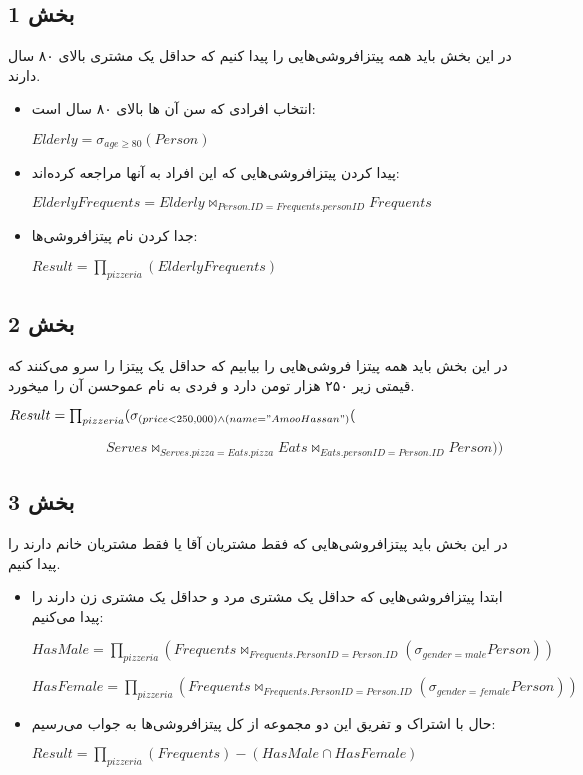 \subsection*{بخش 1}
در این بخش باید همه پیتزافروشی‌هایی را پیدا کنیم که حداقل یک مشتری بالای ۸۰ سال دارند.
\begin{itemize}	
	\item انتخاب افرادی که سن آن ها بالای ۸۰ سال است:
	
	\setLTR
	$Elderly = \sigma_{age \geq 80} (Person)$
	\setRTL
	\item پیدا کردن پیتزافروشی‌هایی که این افراد به آنها مراجعه کرده‌اند:
	
	\setLTR
	$ElderlyFrequents = Elderly \bowtie_{Person.ID=Frequents.personID} Frequents$
	\setRTL
	
	\item جدا کردن نام پیتزافروشی‌ها:
	
	\setLTR
	$Result = \prod_{pizzeria} (ElderlyFrequents)$
	\setRTL
\end{itemize}




\subsection*{بخش 2}
در این بخش باید همه پیتزا فروشی‌هایی را بیابیم که حداقل یک پیتزا را سرو می‌کنند که قیمتی زیر ۲۵۰ هزار
تومن دارد و فردی به نام عموحسن آن را میخورد.

	\setLTR
	$Result = \prod_{pizzeria}(\sigma_{(price<250,000)\land(name="Amoo Hassan")}($
	
	$\qquad \qquad \qquad \quad  Serves\bowtie_{Serves.pizza=Eats.pizza}Eats \bowtie_{Eats.personID=Person.ID}Person))$

	\setRTL


\subsection*{بخش 3}
در این بخش باید پیتزافروشی‌هایی که فقط مشتریان آقا یا فقط مشتریان خانم دارند را پیدا کنیم.
\begin{itemize}	
	\item 
	ابتدا پیتزافروشی‌هایی که حداقل یک مشتری مرد و حداقل یک مشتری زن دارند را پیدا می‌کنیم:
	
	\setLTR
	$HasMale = \prod_{pizzeria}(Frequents \bowtie_{Frequents.PersonID=Person.ID}(\sigma_{gender=male}Person))$
	
	$HasFemale = \prod_{pizzeria}(Frequents \bowtie_{Frequents.PersonID=Person.ID}(\sigma_{gender=female}Person))$
	\setRTL
	
	\item 
	حال با اشتراک و تفریق این دو مجموعه از کل پیتزافروشی‌ها به جواب می‌رسیم:
	\setLTR
	
	$Result = \prod_{pizzeria}(Frequents) - (HasMale \cap HasFemale)$
	\setRTL
	
	
	
\end{itemize}


